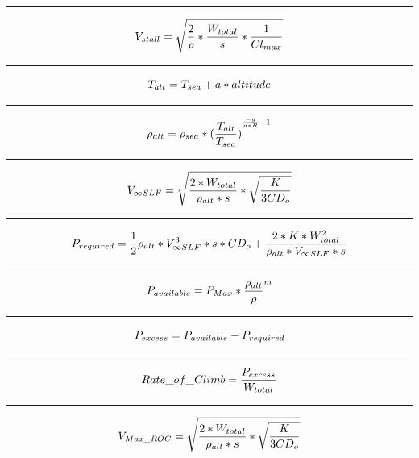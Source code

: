 \documentclass[12pt,A4paper]{article}
\begin{document}
		\hrule
		\vspace{0.1 in}
		\begin{equation}
			V_{stall} = \sqrt{\frac{2}{\rho}*\frac{W_{total}}{s}*\frac{1}{Cl_{max}}} \\
		\end{equation}
		\hrule
		\vspace{0.1 in}
		\begin{equation}
			T_{alt} = T_{sea} + a*altitude \\
		\end{equation}
		\hrule
		\vspace{0.1 in}
		\begin{equation}
			\rho_{alt} = \rho_{sea} * {(\frac{T_{alt}}{T_{sea}})}^{\frac{-g}{a*R}-1}\\
		\end{equation}
		\hrule
		\vspace{0.1 in}
		\begin{equation}
			V_{\infty SLF} = \sqrt{\frac{2*W_{total}}{\rho_{alt} * s} * \sqrt{\frac{K}{3CD_o}}}\\
		\end{equation}
		\hrule
		\vspace{0.1 in}
		\begin{equation}
			P_{required} = \frac{1}{2} \rho_{alt} * V_{\infty SLF}^3 * s * CD_o + \frac{2 * K * W_{total}^2}{\rho_{alt}*V_{\infty SLF}*s} \\
		\end{equation}
		\hrule
		\vspace{0.1 in}
		\begin{equation}
			P_{available} = P_{Max} * {\frac{\rho_{alt}}{\rho}}^m \\
		\end{equation}
		\hrule
		\vspace{0.1 in}
		\begin{equation}
			P_{excess} = P_{available} - P_{required} \\
		\end{equation}
		\hrule
		\vspace{0.1 in}
		\begin{equation}
			Rate\_of\_Climb = \frac{P_{excess}}{W_{total}} \\
		\end{equation}
		\hrule
		\vspace{0.1 in}
		\begin{equation}
			V_{Max\_ROC} = \sqrt{{\frac{2*W_{total}}{\rho_{alt}*s}} * \sqrt{\frac{K}{3CD_o}}} \\
		\end{equation}
\end{document}
